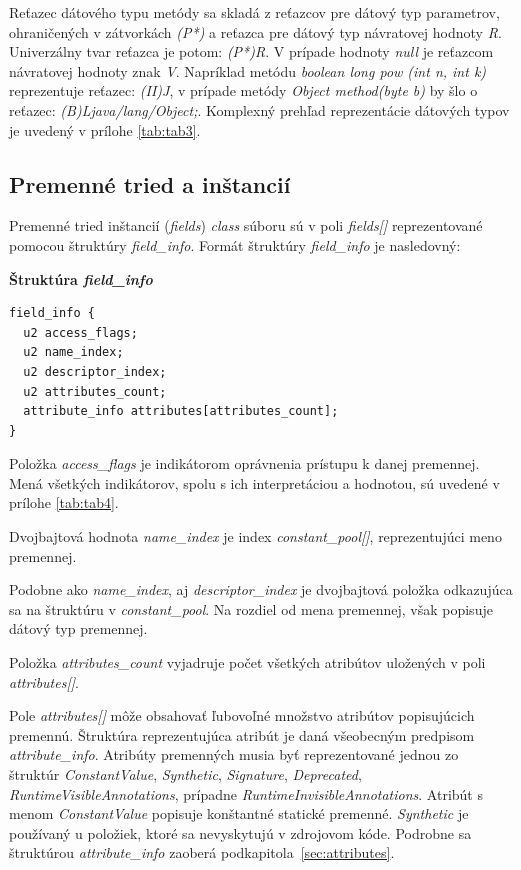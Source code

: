 \documentclass[11pt,final,oneside]{fithesis}
\newenvironment{example}[1]
{
\vspace{3mm}
\noindent\textbf{#1}
\vspace{2mm}
}
{
\vspace{3mm}
}
\begin{document}
Reťazec dátového typu metódy sa skladá z reťazcov pre dátový typ parametrov,
ohraničených v zátvorkách \textit{(P*)} a reťazca pre dátový typ návratovej
hodnoty \textit{R}. Univerzálny tvar reťazca je potom:
\textit{(P*)R}.
V prípade hodnoty \textit{null} je reťazcom návratovej hodnoty znak
\textit{V}. Napríklad metódu \textit{boolean long pow (int n, int k)}
reprezentuje reťazec: \textit{(II)J}, v prípade metódy
\textit{Object method(byte b)} by šlo o reťazec:
\textit{(B)Ljava/lang/Object;}. Komplexný prehľad reprezentácie dátových typov
je uvedený v prílohe \ref{tab:tab3}.

\subsection{Premenné tried a inštancií}
\label{sec:fields}
Premenné tried inštancií (\textit{fields}) \textit{class} súboru sú v poli
\textit{fields[]} reprezentované pomocou štruktúry \textit{field\_info}.
Formát štruktúry \textit{field\_info} je nasledovný:

\begin{example}{Štruktúra \textit{field\_info}}
\begin{verbatim}
field_info {
  u2 access_flags;
  u2 name_index;
  u2 descriptor_index;
  u2 attributes_count;
  attribute_info attributes[attributes_count];
}
\end{verbatim}
\end{example}

Položka \textit{access\_flags} je indikátorom oprávnenia prístupu k danej
premennej. Mená všetkých indikátorov, spolu s ich interpretáciou a hodnotou, 
sú uvedené v prílohe \ref{tab:tab4}.
     
Dvojbajtová hodnota \textit{name\_index} je index \textit{constant\_pool[]},
reprezentujúci meno premennej.

Podobne ako \textit{name\_index}, aj \textit{descriptor\_index} je dvojbajtová
položka odkazujúca sa na štruktúru v \textit{constant\_pool}. Na rozdiel od
mena premennej, však popisuje dátový typ premennej.

Položka \textit{attributes\_count} vyjadruje počet všetkých atribútov 
uložených v poli \textit{attributes[]}.

Pole \textit{attributes[]} môže obsahovať ľubovoľné množstvo atribútov
popisujúcich premennú. Štruktúra reprezentujúca atribút je daná všeobecným
predpisom \textit{attribute\_info}. Atribúty premenných musia byť
reprezentované jednou zo štruktúr \textit{ConstantValue}, \textit{Synthetic},
\textit{Signature}, \textit{Deprecated}, \textit{RuntimeVisibleAnnotations},
prípadne \textit{RuntimeInvisibleAnnotations}. Atribút s menom
\textit{ConstantValue} popisuje konštantné statické premenné.
\textit{Synthetic} je používaný u položiek, ktoré sa nevyskytujú v zdrojovom 
kóde. Podrobne sa štruktúrou \textit{attribute\_info} zaoberá
podkapitola~\ref{sec:attributes}.
\end{document}
